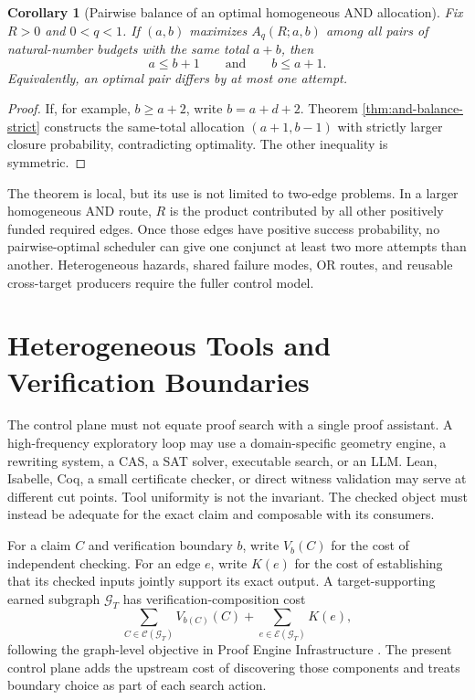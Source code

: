 \documentclass[11pt]{article}
\newtheorem{corollary}[definition]{Corollary}
\begin{document}
\begin{corollary}[Pairwise balance of an optimal homogeneous AND allocation]
\label{cor:and-pairwise-balance}
Fix $R>0$ and $0<q<1$.  If $(a,b)$ maximizes $A_q(R;a,b)$ among all pairs of
natural-number budgets with the same total $a+b$, then
\[
  a\leq b+1\qquad\text{and}\qquad b\leq a+1.
\]
Equivalently, an optimal pair differs by at most one attempt.
\end{corollary}

\begin{proof}
If, for example, $b\geq a+2$, write $b=a+d+2$.  Theorem
\ref{thm:and-balance-strict} constructs the same-total allocation
$(a+1,b-1)$ with strictly larger closure probability, contradicting
optimality.  The other inequality is symmetric.
\end{proof}

The theorem is local, but its use is not limited to two-edge problems.  In a
larger homogeneous AND route, $R$ is the product contributed by all other
positively funded required edges.  Once those edges have positive success
probability, no pairwise-optimal scheduler can give one conjunct at least two
more attempts than another.  Heterogeneous hazards, shared failure modes, OR
routes, and reusable cross-target producers require the fuller control model.

\section{Heterogeneous Tools and Verification Boundaries}

The control plane must not equate proof search with a single proof assistant.
A high-frequency exploratory loop may use a domain-specific geometry engine,
a rewriting system, a CAS, a SAT solver, executable search, or an LLM.  Lean,
Isabelle, Coq, a small certificate checker, or direct witness validation may
serve at different cut points.  Tool uniformity is not the invariant.  The
checked object must instead be adequate for the exact claim and composable with
its consumers.

For a claim $C$ and verification boundary $b$, write $V_b(C)$ for the cost of
independent checking.  For an edge $e$, write $K(e)$ for the cost of
establishing that its checked inputs jointly support its exact output.  A
target-supporting earned subgraph $\mathcal G_T$ has verification-composition
cost
\[
  \sum_{C\in\mathcal C(\mathcal G_T)}V_{b(C)}(C)
  +\sum_{e\in\mathcal E(\mathcal G_T)}K(e),
\]
following the graph-level objective in Proof Engine Infrastructure
\citep{li2026proofengine}.  The present control plane adds the upstream cost of
discovering those components and treats boundary choice as part of each search
action.
\end{document}
